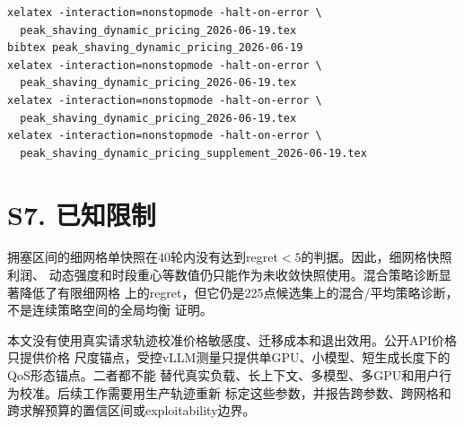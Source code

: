 \documentclass[UTF8,11pt]{ctexart}
\begin{document}
\begin{verbatim}
xelatex -interaction=nonstopmode -halt-on-error \
  peak_shaving_dynamic_pricing_2026-06-19.tex
bibtex peak_shaving_dynamic_pricing_2026-06-19
xelatex -interaction=nonstopmode -halt-on-error \
  peak_shaving_dynamic_pricing_2026-06-19.tex
xelatex -interaction=nonstopmode -halt-on-error \
  peak_shaving_dynamic_pricing_2026-06-19.tex
xelatex -interaction=nonstopmode -halt-on-error \
  peak_shaving_dynamic_pricing_supplement_2026-06-19.tex
\end{verbatim}

\section*{S7. 已知限制}

拥塞区间的细网格单快照在40轮内没有达到regret$<5$的判据。因此，细网格快照利润、
动态强度和时段重心等数值仍只能作为未收敛快照使用。混合策略诊断显著降低了有限细网格
上的regret，但它仍是225点候选集上的混合/平均策略诊断，不是连续策略空间的全局均衡
证明。

本文没有使用真实请求轨迹校准价格敏感度、迁移成本和退出效用。公开API价格只提供价格
尺度锚点，受控vLLM测量只提供单GPU、小模型、短生成长度下的QoS形态锚点。二者都不能
替代真实负载、长上下文、多模型、多GPU和用户行为校准。后续工作需要用生产轨迹重新
标定这些参数，并报告跨参数、跨网格和跨求解预算的置信区间或exploitability边界。
\end{document}
